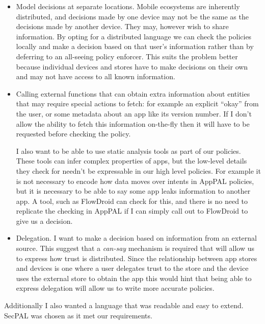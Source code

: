 \documentclass[thesis.tex]{subfiles}
\begin{document}
\begin{itemize}
  \item Model decisions at separate locations.  Mobile ecosystems are
    inherently distributed, and decisions made by one device may not be
    the same as the decisions made by another device.  They may, however
    wish to share information.  By opting for a distributed language we
    can check the policies locally and make a decision based on that
    user's information rather than by deferring to an all-seeing policy
    enforcer.  This suits the problem better because individual devices
    and stores have to make decisions on their own and may not have access
    to all known information.

  \item Calling external functions that can obtain extra information
    about entities that may require special actions to fetch: for example
    an explicit ``okay'' from the user, or some metadata about an app like
    its version number.  If I don't allow the ability to fetch this
    information on-the-fly then it will have to be requested before
    checking the policy. 

    I also want to be able to use static analysis tools as part of
    our policies.  These tools can infer complex properties of apps, but
    the low-level details they check for needn't be expressable in our
    high level policies.  For example it is not necessary to encode how
    data moves over intents in AppPAL policies, but it is necessary to be
    able to say some app leaks information to another app.  A tool, such
    as FlowDroid can check for this, and there is no need to replicate the
    checking in AppPAL if I can simply call out to FlowDroid to give us a
    decision.

  \item Delegation.  I want to make a decision based on information from an
    external source.  This suggest that a \emph{can-say} mechanism is required
    that will allow us to express how trust is distributed.   Since the
    relationship between app stores and devices is one where a user delegates
    trust to the store and the device uses the external store to obtain the app
    this would hint that being able to express delegation will allow us to write
    more accurate policies.
\end{itemize}

Additionally I also wanted a language that was readable and easy to extend.
SecPAL was chosen as it met our requirements.
\end{document}
